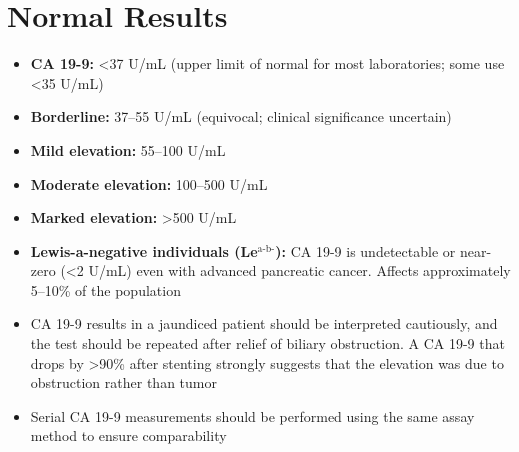 \section*{Normal Results}
\begin{itemize}
  \item \textbf{CA 19-9:} <37 U/mL (upper limit of normal for most laboratories; some use <35 U/mL)
  \item \textbf{Borderline:} 37--55 U/mL (equivocal; clinical significance uncertain)
  \item \textbf{Mild elevation:} 55--100 U/mL
  \item \textbf{Moderate elevation:} 100--500 U/mL
  \item \textbf{Marked elevation:} >500 U/mL
  \item \textbf{Lewis-a-negative individuals (Le$^\text{a-b-}$):} CA 19-9 is undetectable or near-zero (<2 U/mL) even with advanced pancreatic cancer. Affects approximately 5--10\% of the population
  \item CA 19-9 results in a jaundiced patient should be interpreted cautiously, and the test should be repeated after relief of biliary obstruction. A CA 19-9 that drops by >90\% after stenting strongly suggests that the elevation was due to obstruction rather than tumor
  \item Serial CA 19-9 measurements should be performed using the same assay method to ensure comparability
\end{itemize}

